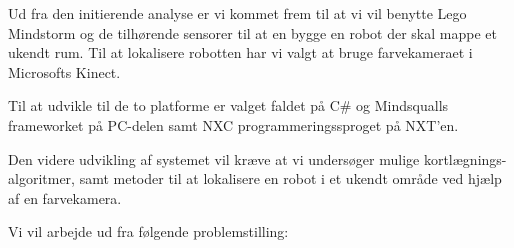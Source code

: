 
Ud fra den initierende analyse er vi kommet frem til at vi vil benytte Lego Mindstorm og de tilhørende sensorer til at en bygge en robot der skal mappe et ukendt rum.
Til at lokalisere robotten har vi valgt at bruge farvekameraet i Microsofts Kinect.

Til at udvikle til de to platforme er valget faldet på C\# og Mindsqualls frameworket på PC-delen samt NXC programmeringssproget på NXT'en.

Den videre udvikling af systemet vil kræve at vi undersøger mulige kortlægnings-algoritmer, samt metoder til at lokalisere en robot i et ukendt område ved hjælp af en farvekamera.

Vi vil arbejde ud fra følgende problemstilling:

\begin{samepage}


\end{samepage}